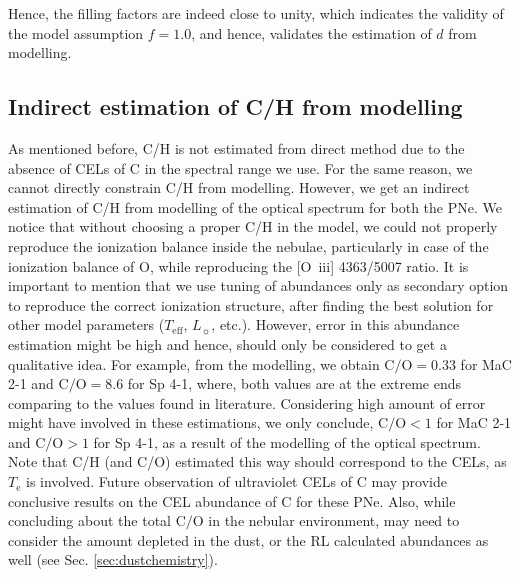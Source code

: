 \documentclass[a4paper,fleqn,usenatbib]{mnras}
\begin{document}
                                                                                                                                                                                                                                                                                                                                                                                                                                                                                                                                                                                                                                                                                                                                                             
Hence, the filling factors are indeed close to unity, which indicates the validity of the model assumption $f=1.0$, and hence, validates the estimation of $d$ from modelling.


\subsection{Indirect estimation of C/H from modelling} \label{sec:C/H}
As mentioned before, C/H is not estimated from direct method due to the absence of CELs of C in the spectral range we use. For the same reason, we cannot directly constrain C/H from modelling. However, we get an indirect estimation of C/H from modelling of the optical spectrum for both the PNe. We notice that without choosing a proper C/H in the model, we could not properly reproduce the ionization balance inside the nebulae, particularly in case of the ionization balance of O, while reproducing the [O~{\sc iii}] 4363/5007 ratio. It is important to mention that we use tuning of abundances only as secondary option to reproduce the correct ionization structure, after finding the best solution for other model parameters ($T_\mathrm{eff}$, $L_{\sun}$, etc.). However, error in this abundance estimation might be high and hence, should only be considered to get a qualitative idea. For example, from the modelling, we obtain $\mathrm{C/O}=0.33$ for MaC 2-1 and $\mathrm{C/O}=8.6$ for Sp 4-1, where, both values are at the extreme ends comparing to the values found in literature. Considering high amount of error might have involved in these estimations, we only conclude, $\mathrm{C/O}<1$ for MaC 2-1 and $\mathrm{C/O}>1$ for Sp 4-1, as a result of the modelling of the optical spectrum. Note that C/H (and C/O) estimated this way should correspond to the CELs, as $T_\mathrm{e}$ is involved. Future observation of ultraviolet CELs of C may provide conclusive results on the CEL abundance of C for these PNe. Also, while concluding about the total $\mathrm{C/O}$ in the nebular environment, may need to consider the amount depleted in the dust, or the RL calculated abundances as well (see Sec. \ref{sec:dustchemistry}).
 
\end{document}

